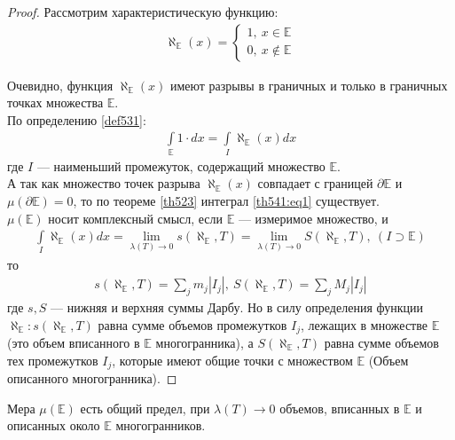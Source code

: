 \begin{proof}
  Рассмотрим характеристическую функцию:
  \begin{gather*}
    \aleph_{\mathbb{E}}(x) =
    \begin{cases}
      1, \ x \in \mathbb{E} \\
      0, \ x \not \in \mathbb{E}
    \end{cases}
  \end{gather*}
  \begin{comment}
    $\aleph$ --- Алеф.
  \end{comment}
  Очевидно, функция $\aleph_{\mathbb{E}}(x)$ имеют разрывы в граничных и только
  в граничных точках множества $\mathbb{E}$. \\
  По определению \eqref{def531}:
  \begin{gather}
    \int\limits_{\mathbb{E}} 1 \cdot dx = \int\limits_I \aleph_{\mathbb{E}}(x)
    dx
    \label{th541:eq1}
  \end{gather}
  где $I$ --- наименьший промежуток, содержащий множество $\mathbb{E}$. \\
  А так как множество точек разрыва $\aleph_{\mathbb{E}}(x)$ совпадает с
  границей $\partial \mathbb{E}$ и $\mu(\partial \mathbb{E}) = 0$, то по
  теореме \eqref{th523} интеграл \eqref{th541:eq1} существует. \\
  $\mu(\mathbb{E})$ носит комплексный смысл, если $\mathbb{E}$ --- измеримое
  множество, и
  \begin{gather*}
    \int\limits_I \aleph_{\mathbb{E}}(x) dx = \lim\limits_{\lambda(T) \to 0}
    s(\aleph_{\mathbb{E}}, T) = \lim\limits_{\lambda(T) \to 0}
    S(\aleph_{\mathbb{E}}, T), \ (I \supset \mathbb{E})
  \end{gather*}
  то
  \begin{gather*}
    s(\aleph_{\mathbb{E}}, T) = \sum\limits_{j} m_j |I_j|, \
    S(\aleph_{\mathbb{E}}, T) = \sum\limits_{j} M_j |I_j|
  \end{gather*}
  где $s, S$ --- нижняя и верхняя суммы Дарбу. Но в силу определения функции
  $\aleph_{\mathbb{E}}: s(\aleph_{\mathbb{E}}, T)$ равна сумме объемов
  промежутков $I_j$, лежащих в множестве $\mathbb{E}$ (это объем вписанного в
  $\mathbb{E}$ многогранника), а $S(\aleph_{\mathbb{E}}, T)$ равна сумме
  объемов тех промежутков $I_j$, которые имеют общие точки с множеством
  $\mathbb{E}$ (Объем описанного многогранника).
\end{proof}

\begin{approval}
  Мера $\mu(\mathbb{E})$ есть общий предел, при $\lambda(T) \to 0$ объемов,
  вписанных в $\mathbb{E}$ и описанных около $\mathbb{E}$ многогранников.
\end{approval}

